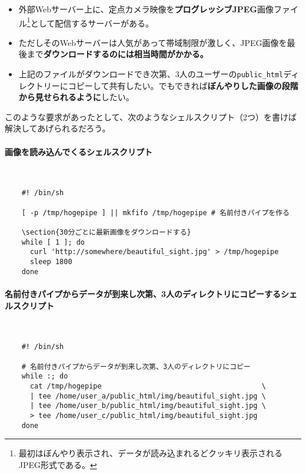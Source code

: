 \begin{itemize}
  \item 外部Webサーバー上に、定点カメラ映像を\textbf{プログレッシブJPEG}画像ファイル\footnote{最初はぼんやり表示され、データが読み込まれるどクッキリ表示されるJPEG形式である。}として配信するサーバーがある。
  \item ただしそのWebサーバーは人気があって帯域制限が激しく、JPEG画像を最後まで\textbf{ダウンロードするのには相当時間がかかる。}
  \item 上記のファイルがダウンロードでき次第、3人のユーザーの\verb|public_html|ディレクトリーにコピーして共有したい。でもできれば\textbf{ぼんやりした画像の段階から見せられるように}したい。
\end{itemize}

このような要求があったとして、次のようなシェルスクリプト（2つ）を書けば解決してあげられるだろう。

\paragraph{画像を読み込んでくるシェルスクリプト} 　\\
\begin{frameboxit}{160.0mm}
\begin{verbatim}
	#! /bin/sh

	[ -p /tmp/hogepipe ] || mkfifo /tmp/hogepipe # 名前付きパイプを作る

	\section{30分ごとに最新画像をダウンロードする}
	while [ 1 ]; do
	  curl 'http://somewhere/beautiful_sight.jpg' > /tmp/hogepipe
	  sleep 1800
	done
\end{verbatim}
\end{frameboxit}
\paragraph{名前付きパイプからデータが到来し次第、3人のディレクトリにコピーするシェルスクリプト} 　\\
\begin{frameboxit}{160.0mm}
\begin{verbatim}
	#! /bin/sh

	# 名前付きパイプからデータが到来し次第、3人のディレクトリにコピー
	while :; do
	  cat /tmp/hogepipe                                      \
	  | tee /home/user_a/public_html/img/beautiful_sight.jpg \
	  | tee /home/user_b/public_html/img/beautiful_sight.jpg \
	  > tee /home/user_c/public_html/img/beautiful_sight.jpg
	done
\end{verbatim}
\end{frameboxit}

